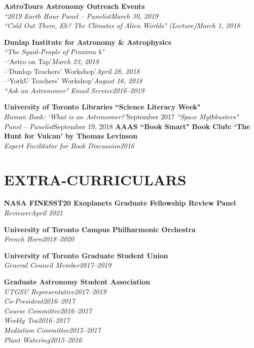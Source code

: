 \documentclass[10pt]{res} %
\begin{document}
\begin{resume}
\textbf{AstroTours Astronomy Outreach Events}\\
{\sl ``2019 Earth Hour Panel -- Panelist}\hfill{\sl March 30, 2019}\\
{\sl ``Cold Out There, Eh? The Climates of Alien Worlds" (Lecture)}\hfill{\sl March 1, 2018}%

\textbf{Dunlap Institute for Astronomy \& Astrophysics}\\
{\sl ``The Squid-People of Proxima b"}\\
 {--\hspace{10mm}`Astro on Tap'}\hfill{\sl March 23, 2018}\\
 {--\hspace{10mm}`Dunlap Teachers' Workshop'}\hfill{\sl April 28, 2018}\\
 {--\hspace{10mm}`YorkU Teachers' Workshop'}\hfill{\sl August 16, 2018}\\
{\sl ``Ask an Astronomer" Email Service}\hfill{\sl 2016--2019}%

\textbf{University of Toronto Libraries ``Science Literacy Week"}\\
{\sl Human Book: `What is an Astronomer?'}\hfill{September 2017}
{\sl ``Space Mythbusters" Panel -- Panelist}\hfill{September 19, 2018}
\textbf{AAAS ``Book Smart" Book Club: `The Hunt for Vulcan' by Thomas Levinson}\\
{\sl Expert Facilitator for Book Discussion}\hfill{\sl 2016}

\section{EXTRA-CURRICULARS} 
% 
\textbf{NASA FINESST20 Exoplanets Graduate Fellowship Review Panel}\\
{\sl Reviewer}\hfill{\sl April 2021}

 \textbf{University of Toronto Campus Philharmonic Orchestra}\\
{\sl French Horn}\hfill{\sl 2018--2020}

\textbf{University of Toronto Graduate Student Union}\\
{\sl General Council Member}\hfill{\sl 2017--2019}

\textbf{Graduate Astronomy Student Association}\\
{\sl UTGSU Representative}\hfill{\sl 2017--2019}\\
{\sl Co-President}\hfill{\sl 2016--2017}\\
{\sl Course Committee}\hfill{\sl 2016--2017}\\
{\sl Weekly Tea}\hfill{\sl 2016--2017}\\
{\sl Mediation Committee}\hfill{\sl 2015--2017}\\
{\sl Plant Watering}\hfill{\sl 2015--2016}


\end{resume}
\end{document}
